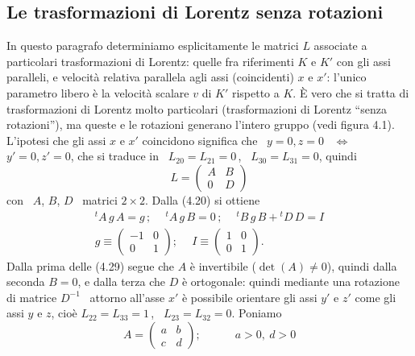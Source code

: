 \subsection{Le trasformazioni di Lorentz senza rotazioni}

In questo paragrafo determiniamo esplicitamente le matrici $L$ associate a
particolari trasformazioni di Lorentz: quelle fra riferimenti $K$ e $K'$ con gli
assi paralleli, e velocit\`a relativa parallela agli assi (coincidenti) $x$ e
$x'$: l'unico parametro libero \`e la velocit\`a scalare $v$ di $K'$ rispetto a
$K$. \`E vero che si tratta di trasformazioni di Lorentz molto
particolari (trasformazioni di Lorentz ``senza rotazioni''), ma queste e le
rotazioni generano l'intero gruppo (vedi figura 4.1).\\
L'ipotesi che gli assi $x$ e $x'$ coincidono significa che \ $y=0,z=0$
\ $\Leftrightarrow$ \ $y'=0,z'=0$, che si traduce in \ $L_{20}=L_{21}=0$\,,
\ $L_{30}=L_{31}=0$, quindi
\begin{equation}
  L=\begin{pmatrix}A&B\\0&D\end{pmatrix}
  \tag{4.28}
\end{equation}
con \ $A$, $B$, $D$ \ matrici $2\times2$. Dalla (4.20) si ottiene
\begin{equation}
  \begin{gathered}
    {}^tA\,g\,A=g\,;\quad\ {}^tA\,g\,B=0\,;\quad\ {}^tB\,g\,B+{}^tD\,D=I\\
    g\equiv\begin{pmatrix}-1&0\\0&1\end{pmatrix};\quad\ I\equiv\begin{pmatrix}1
    &0\\0&1\end{pmatrix}.
  \end{gathered}
  \tag{4.29}
\end{equation}
Dalla prima delle (4.29) segue che $A$ \`e invertibile ($\det(A)\neq0$), quindi
dalla seconda $B=0$, e dalla terza che $D$ \`e ortogonale: quindi mediante una
rotazione di matrice $D^{-1}$ \ attorno all'asse $x'$ \`e possibile orientare
gli assi $y'$ e $z'$ come gli assi $y$ e $z$, cio\`e $L_{22}=L_{33}=1$\,,
\ $L_{23}=L_{32}=0$. Poniamo
\begin{equation}
  A=\begin{pmatrix}a&b\\c&d\end{pmatrix};\qquad\quad a>0,\ d>0
  \tag{4.30}
\end{equation}

